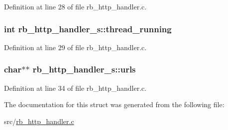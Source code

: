 Definition at line 28 of file rb\-\_\-http\-\_\-handler.\-c.

\hypertarget{structrb__http__handler__s_a978656c7c89a80d411121107c97a0dcd}{
\subsubsection[{thread\-\_\-running}]{\setlength{\rightskip}{0pt plus 5cm}int rb\-\_\-http\-\_\-handler\-\_\-s\-::thread\-\_\-running}}\label{structrb__http__handler__s_a978656c7c89a80d411121107c97a0dcd}


Definition at line 29 of file rb\-\_\-http\-\_\-handler.\-c.

\hypertarget{structrb__http__handler__s_a651ea67df6280142010181fb0f418a19}{
\subsubsection[{urls}]{\setlength{\rightskip}{0pt plus 5cm}char$\ast$$\ast$ rb\-\_\-http\-\_\-handler\-\_\-s\-::urls}}\label{structrb__http__handler__s_a651ea67df6280142010181fb0f418a19}


Definition at line 34 of file rb\-\_\-http\-\_\-handler.\-c.



The documentation for this struct was generated from the following file\-:\begin{DoxyCompactItemize}
\item 
src/\hyperlink{rb__http__handler_8c}{rb\-\_\-http\-\_\-handler.\-c}\end{DoxyCompactItemize}
